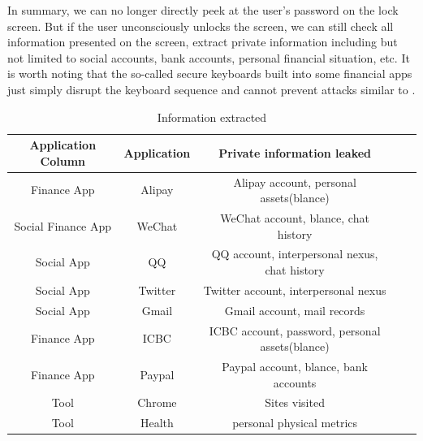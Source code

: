 In summary, we can no longer directly peek at the user’s password on the lock screen. But if the user unconsciously unlocks the screen, we can still check all information presented on the screen, extract private information including but not limited to social accounts, bank accounts, personal financial situation, etc. It is worth noting that the so-called secure keyboards built into some financial apps just simply disrupt the keyboard sequence and cannot prevent attacks similar to \tool.


\begin{table}
	\centering
	\begin{tabular}{|c|c|c|c|c|}
		\hline
		Application Column  & Application & Private information leaked                       \\
		\hline
		Finance App         & Alipay      & Alipay account, personal assets(blance)          \\
		\hline
		Social  Finance App & WeChat      & WeChat account, blance, chat history             \\
		\hline
		Social App          & QQ          & QQ account, interpersonal nexus, chat history    \\
		\hline
		Social App          & Twitter     & Twitter account, interpersonal nexus             \\
		\hline
		Social App          & Gmail       & Gmail account, mail records                      \\
		\hline
		Finance App         & ICBC        & ICBC account, password, personal assets(blance)  \\
		\hline
		Finance App         & Paypal      & Paypal account, blance, bank accounts            \\
		\hline
		Tool                & Chrome      & Sites visited                                    \\
		\hline
		Tool                & Health      & personal physical metrics      					 \\
		\hline
	\end{tabular}
	\linebreak
	\caption{Information extracted}
	\label{table:information_extracted}
\end{table}